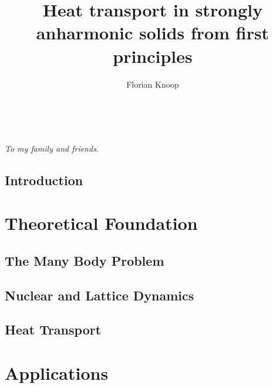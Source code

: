 \documentclass[nobib,a4paper,twoside,notoc,justified,marginals=justified]{tufte-book}
\title{Heat transport in strongly anharmonic solids from first principles}
\author{Florian Knoop}
\newcommand{\blankpage}{\newpage\hbox{}\thispagestyle{empty}\newpage}
\begin{document}
\frontmatter
{}
  
%  




\tableofcontents


\cleardoublepage
~\vfill
\begin{doublespace}
  \noindent\fontsize{12}{12}\selectfont\itshape
  \nohyphenation
  \thispagestyle{empty}
  \hfill To my family and friends.
\end{doublespace}
\vfill
\vfill


\cleardoublepage

\chapter{Introduction}


\mainmatter
{}  %

\part{Theoretical Foundation}

\chapter{The Many Body Problem}


\chapter{Nuclear and Lattice Dynamics}


\chapter{Heat Transport}


\part{Applications}
\end{document}
